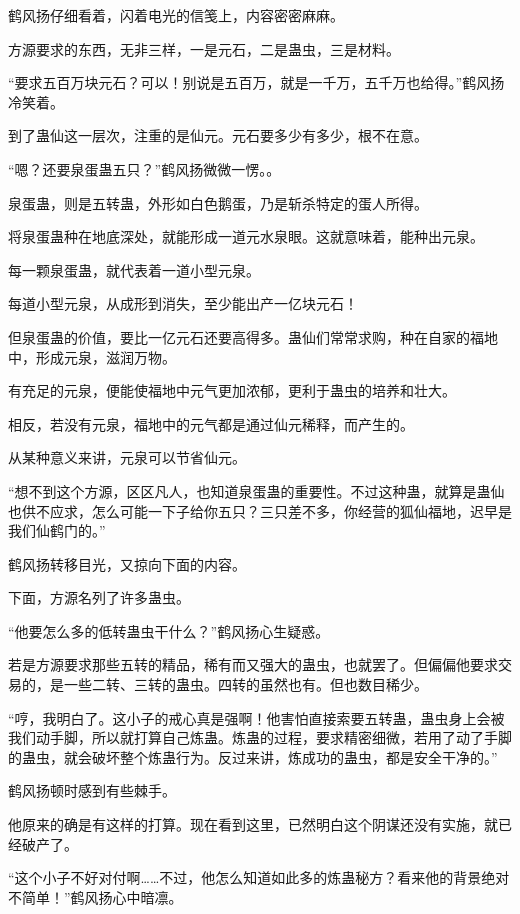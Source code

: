 
\begin{this_body}

鹤风扬仔细看着，闪着电光的信笺上，内容密密麻麻。

方源要求的东西，无非三样，一是元石，二是蛊虫，三是材料。

“要求五百万块元石？可以！别说是五百万，就是一千万，五千万也给得。”鹤风扬冷笑着。

到了蛊仙这一层次，注重的是仙元。元石要多少有多少，根不在意。

“嗯？还要泉蛋蛊五只？”鹤风扬微微一愣。。

泉蛋蛊，则是五转蛊，外形如白色鹅蛋，乃是斩杀特定的蛋人所得。

将泉蛋蛊种在地底深处，就能形成一道元水泉眼。这就意味着，能种出元泉。

每一颗泉蛋蛊，就代表着一道小型元泉。

每道小型元泉，从成形到消失，至少能出产一亿块元石！

但泉蛋蛊的价值，要比一亿元石还要高得多。蛊仙们常常求购，种在自家的福地中，形成元泉，滋润万物。

有充足的元泉，便能使福地中元气更加浓郁，更利于蛊虫的培养和壮大。

相反，若没有元泉，福地中的元气都是通过仙元稀释，而产生的。

从某种意义来讲，元泉可以节省仙元。

“想不到这个方源，区区凡人，也知道泉蛋蛊的重要性。不过这种蛊，就算是蛊仙也供不应求，怎么可能一下子给你五只？三只差不多，你经营的狐仙福地，迟早是我们仙鹤门的。”

鹤风扬转移目光，又掠向下面的内容。

下面，方源名列了许多蛊虫。

“他要怎么多的低转蛊虫干什么？”鹤风扬心生疑惑。

若是方源要求那些五转的精品，稀有而又强大的蛊虫，也就罢了。但偏偏他要求交易的，是一些二转、三转的蛊虫。四转的虽然也有。但也数目稀少。

“哼，我明白了。这小子的戒心真是强啊！他害怕直接索要五转蛊，蛊虫身上会被我们动手脚，所以就打算自己炼蛊。炼蛊的过程，要求精密细微，若用了动了手脚的蛊虫，就会破坏整个炼蛊行为。反过来讲，炼成功的蛊虫，都是安全干净的。”

鹤风扬顿时感到有些棘手。

他原来的确是有这样的打算。现在看到这里，已然明白这个阴谋还没有实施，就已经破产了。

“这个小子不好对付啊……不过，他怎么知道如此多的炼蛊秘方？看来他的背景绝对不简单！”鹤风扬心中暗凛。


\end{this_body}
